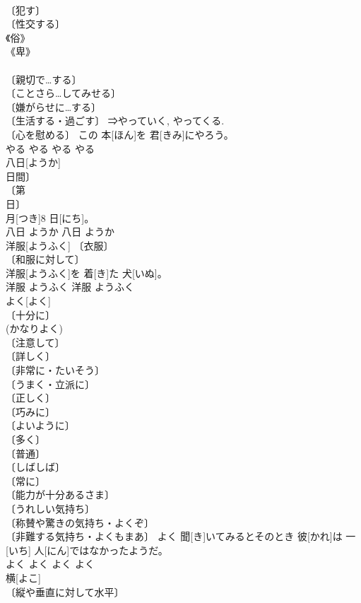 \documentclass[8pt]{extreport}
\begin{document}
\begin{CJK}{UTF8}{min}
\\	〔犯す〕 
\\	〔性交する〕 
\\	《俗》 
\\	《卑》 
\\	[⇒やっつける] 
\\	〔親切で…する〕 
\\	〔ことさら…してみせる〕 
\\	〔嫌がらせに…する〕 
\\	〔生活する・過ごす〕 ⇒やっていく, やってくる. 
\\	〔心を慰める〕	この 本[ほん]を 君[きみ]にやろう。	
\\	やる	やる	やる	やる	
\\	八日[ようか]	
\\	日間〕 
\\	〔第 
\\	日〕 
\\	月[つき]8 日[にち]。	
\\	八日	ようか	八日	ようか	
\\	洋服[ようふく]	〔衣服〕 
\\	〔和服に対して〕 
\\	洋服[ようふく]を 着[き]た 犬[いぬ]。	
\\	洋服	ようふく	洋服	ようふく	
\\	よく[よく]	
\\	〔十分に〕 
\\	(かなりよく) 
\\	〔注意して〕 
\\	〔詳しく〕 
\\	〔非常に・たいそう〕 
\\	〔うまく・立派に〕 
\\	〔正しく〕 
\\	〔巧みに〕 
\\	〔よいように〕 
\\	〔多く〕 
\\	〔普通〕 
\\	〔しばしば〕 
\\	〔常に〕 
\\	〔能力が十分あるさま〕 
\\	〔うれしい気持ち〕 
\\	〔称賛や驚きの気持ち・よくぞ〕 
\\	〔非難する気持ち・よくもまあ〕	よく 聞[き]いてみるとそのとき 彼[かれ]は 一[いち] 人[にん]ではなかったようだ。	
\\	よく	よく	よく	よく	
\\	横[よこ]	
\\	〔縦や垂直に対して水平〕 

\end{CJK}
\end{document}
